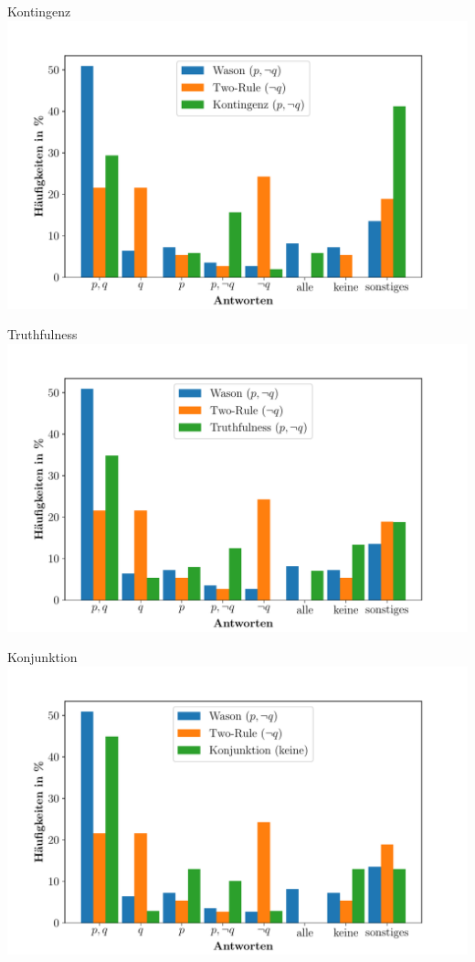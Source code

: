 \begin{frame}{Kontingenz {\scriptsize \cite[S.~109]{stenningHumanReasoningCognitive2008}}}
    \includegraphics[width=\textwidth]{../plot/results_contingency.pdf}
\end{frame}


\begin{frame}{Truthfulness {\scriptsize \cite[S.~109]{stenningHumanReasoningCognitive2008}}}
    \includegraphics[width=\textwidth]{../plot/results_truthfulness.pdf}
\end{frame}


\begin{frame}{Konjunktion {\scriptsize \cite[S.~109]{stenningHumanReasoningCognitive2008}}}
    \includegraphics[width=\textwidth]{../plot/results_conjunction.pdf}
\end{frame}


